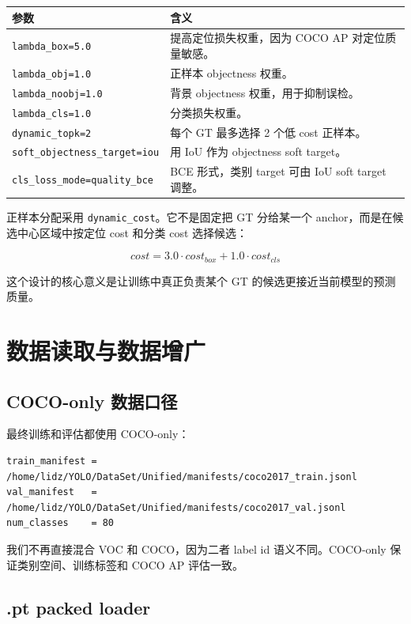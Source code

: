 \documentclass[11pt,a4paper]{article}
\newcommand{\code}[1]{\texttt{#1}}
\begin{document}
\begin{table}[H]
\centering
\begin{tabular}{ll}
\toprule
参数 & 含义 \\
\midrule
\code{lambda\_box=5.0} & 提高定位损失权重，因为 COCO AP 对定位质量敏感。\\
\code{lambda\_obj=1.0} & 正样本 objectness 权重。\\
\code{lambda\_noobj=1.0} & 背景 objectness 权重，用于抑制误检。\\
\code{lambda\_cls=1.0} & 分类损失权重。\\
\code{dynamic\_topk=2} & 每个 GT 最多选择 2 个低 cost 正样本。\\
\code{soft\_objectness\_target=iou} & 用 IoU 作为 objectness soft target。\\
\code{cls\_loss\_mode=quality\_bce} & BCE 形式，类别 target 可由 IoU soft target 调整。\\
\bottomrule
\end{tabular}
\end{table}

正样本分配采用 \code{dynamic\_cost}。它不是固定把 GT 分给某一个 anchor，而是在候选中心区域中按定位 cost 和分类 cost 选择候选：

\[
cost = 3.0\cdot cost_{box} + 1.0\cdot cost_{cls}
\]

这个设计的核心意义是让训练中真正负责某个 GT 的候选更接近当前模型的预测质量。

\section{数据读取与数据增广}

\subsection{COCO-only 数据口径}

最终训练和评估都使用 COCO-only：

\begin{Verbatim}[fontsize=\small]
train_manifest = /home/lidz/YOLO/DataSet/Unified/manifests/coco2017_train.jsonl
val_manifest   = /home/lidz/YOLO/DataSet/Unified/manifests/coco2017_val.jsonl
num_classes    = 80
\end{Verbatim}

我们不再直接混合 VOC 和 COCO，因为二者 label id 语义不同。COCO-only 保证类别空间、训练标签和 COCO AP 评估一致。

\subsection{.pt packed loader}
\end{document}
